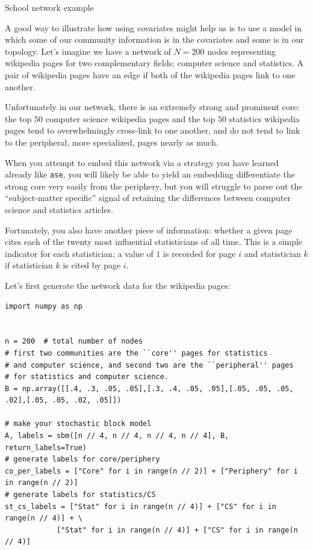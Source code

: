 \begin{floatingbox}[h]\caption{School network example}
A good way to illustrate how using covariates might help us is to use a model in which some of our community information is in the covariates and some is in our topology. Let's imagine we have a network of $N=200$ nodes representing wikipedia pages for two complementary fields; computer science and statistics. A pair of wikipedia pages have an edge if both of the wikipedia pages link to one another. 

Unfortunately in our network, there is an extremely strong and prominent core: the top $50$ computer science wikipedia pages and the top $50$ statistics wikipedia pages tend to overwhelmingly cross-link to one another, and do not tend to link to the peripheral, more specialized, pages nearly as much.

When you attempt to embed this network via a strategy you have learned already like \texttt{ase}, you will likely be able to yield an embedding differentiate the strong core very easily from the periphery, but you will struggle to parse out the ``subject-matter specific'' signal of retaining the differences between computer science and statistics articles.

Fortunately, you also have another piece of information: whether a given page cites each of the twenty most influential statisticians of all time. This is a simple indicator for each statistician; a value of $1$ is recorded for page $i$ and statistician $k$ if statistician $k$ is cited by page $i$.
\end{floatingbox}

Let's first generate the network data for the wikipedia pages:

\begin{lstlisting}[style=python]
import numpy as np


n = 200  # total number of nodes
# first two communities are the ``core'' pages for statistics
# and computer science, and second two are the ``peripheral'' pages
# for statistics and computer science.
B = np.array([[.4, .3, .05, .05],[.3, .4, .05, .05],[.05, .05, .05, .02],[.05, .05, .02, .05]])

# make your stochastic block model
A, labels = sbm([n // 4, n // 4, n // 4, n // 4], B, return_labels=True)
# generate labels for core/periphery
co_per_labels = ["Core" for i in range(n // 2)] + ["Periphery" for i in range(n // 2)]
# generate labels for statistics/CS
st_cs_labels = ["Stat" for i in range(n // 4)] + ["CS" for i in range(n // 4)] + \
            ["Stat" for i in range(n // 4)] + ["CS" for i in range(n // 4)]
\end{lstlisting}


